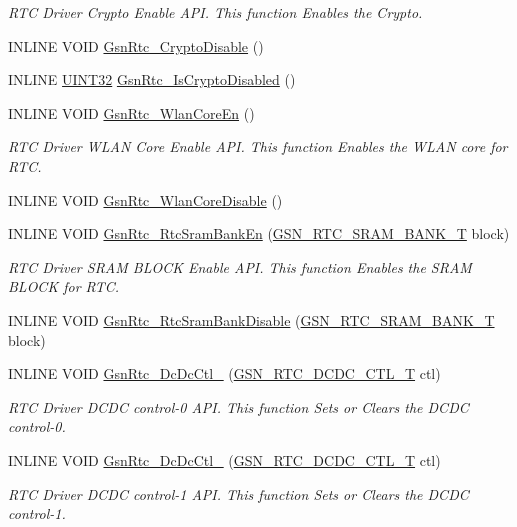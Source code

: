 \begin{DoxyCompactItemize}
\begin{DoxyCompactList}\small\item\em RTC Driver Crypto Enable API. This function Enables the Crypto. \end{DoxyCompactList}\item 
INLINE VOID \hyperlink{a00582_a995995f2a8052a79ce0d12fe690a5758}{GsnRtc\_\-CryptoDisable} ()
\item 
INLINE \hyperlink{a00660_gae1e6edbbc26d6fbc71a90190d0266018}{UINT32} \hyperlink{a00582_a633cfcfa275cbbbc1a36834a69d7f0ed}{GsnRtc\_\-IsCryptoDisabled} ()
\item 
INLINE VOID \hyperlink{a00651_ga84346acd50525b7a6a298aa42f727d05}{GsnRtc\_\-WlanCoreEn} ()
\begin{DoxyCompactList}\small\item\em RTC Driver WLAN Core Enable API. This function Enables the WLAN core for RTC. \end{DoxyCompactList}\item 
INLINE VOID \hyperlink{a00582_aee55eeef8864b3f23efff80af3cbb1ae}{GsnRtc\_\-WlanCoreDisable} ()
\item 
INLINE VOID \hyperlink{a00651_ga82230ca9245f726272600fd645e0b544}{GsnRtc\_\-RtcSramBankEn} (\hyperlink{a00651_ga70bc76d00099ffb3dabb49354ff57870}{GSN\_\-RTC\_\-SRAM\_\-BANK\_\-T} block)
\begin{DoxyCompactList}\small\item\em RTC Driver SRAM BLOCK Enable API. This function Enables the SRAM BLOCK for RTC. \end{DoxyCompactList}\item 
INLINE VOID \hyperlink{a00582_a993860e963231f5f026398c297d33926}{GsnRtc\_\-RtcSramBankDisable} (\hyperlink{a00651_ga70bc76d00099ffb3dabb49354ff57870}{GSN\_\-RTC\_\-SRAM\_\-BANK\_\-T} block)
\item 
INLINE VOID \hyperlink{a00651_ga2a5f3b06d3e70d254d4b9044b87c8006}{GsnRtc\_\-DcDcCtl\_} (\hyperlink{a00651_gadac67c4bef428c38b07db46ce0a24d23}{GSN\_\-RTC\_\-DCDC\_\-CTL\_\-T} ctl)
\begin{DoxyCompactList}\small\item\em RTC Driver DCDC control-\/0 API. This function Sets or Clears the DCDC control-\/0. \end{DoxyCompactList}\item 
INLINE VOID \hyperlink{a00651_ga139c57e6eaeffd048de0c51ccee20b64}{GsnRtc\_\-DcDcCtl\_} (\hyperlink{a00651_gadac67c4bef428c38b07db46ce0a24d23}{GSN\_\-RTC\_\-DCDC\_\-CTL\_\-T} ctl)
\begin{DoxyCompactList}\small\item\em RTC Driver DCDC control-\/1 API. This function Sets or Clears the DCDC control-\/1. \end{DoxyCompactList}\item 

\end{DoxyCompactItemize}
